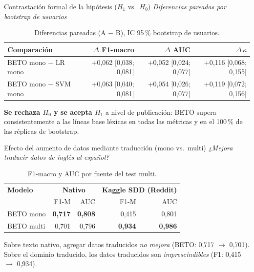 ﻿\documentclass[11pt,aspectratio=169]{beamer}
\newcommand{\ugrsubtitle}[1]{%
  \vskip-0.25cm
  \small\textcolor{ugrGris}{\emph{#1}}\par
  \vskip0.15cm
}
\newcommand{\ugrblock}[2]{
  \begin{tcolorbox}[
    enhanced, colback=ugrFondoClaro, colframe=ugrAzul, boxrule=0.8pt, arc=3pt,
    title={\textbf{#1}}, fonttitle=\small\bfseries, coltitle=white, colbacktitle=ugrAzul,
    left=6pt, right=6pt, top=2pt, bottom=2pt, before skip=0.3em, after skip=0.2em
  ]
    #2
  \end{tcolorbox}
}
\newcommand{\ugrblockok}[2]{
  \begin{tcolorbox}[
    enhanced, colback=ugrVerde!8, colframe=ugrVerde, boxrule=0.8pt, arc=3pt,
    title={\textbf{#1}}, fonttitle=\small\bfseries, coltitle=white, colbacktitle=ugrVerde,
    left=6pt, right=6pt, top=2pt, bottom=2pt, before skip=0.3em, after skip=0.2em
  ]
    #2
  \end{tcolorbox}
}
\begin{document}
\begin{frame}{Contrastación formal de la hipótesis ($H_1$ vs.\ $H_0$)}
  \ugrsubtitle{Diferencias pareadas por bootstrap de usuarios}
  \begin{table}
    \centering\footnotesize
    \setlength{\tabcolsep}{4pt}
    \caption{Diferencias pareadas (A $-$ B), IC 95\,\% bootstrap de usuarios.}
    \begin{tabular}{lrrr}
      \toprule
      \textbf{Comparación} & $\Delta$ F1-macro & $\Delta$ AUC & $\Delta\,\kappa$ \\
      \midrule
      BETO mono $-$ LR mono & +0{,}062 {[0{,}038; 0{,}081]} & +0{,}052 {[0{,}024; 0{,}077]} & +0{,}116 {[0{,}068; 0{,}155]} \\
      BETO mono $-$ SVM mono & +0{,}063 {[0{,}040; 0{,}081]} & +0{,}054 {[0{,}026; 0{,}077]} & +0{,}119 {[0{,}072; 0{,}156]} \\
      \bottomrule
    \end{tabular}
  \end{table}
  \ugrblockok{Decisión formal}{
    \textbf{Se rechaza $H_0$ y se acepta $H_1$} a nivel de publicación: BETO supera consistentemente a las líneas base léxicas en todas las métricas y en el 100\,\% de las réplicas de bootstrap.
  }
\end{frame}

\begin{frame}{Efecto del aumento de datos mediante traducción (mono vs.\ multi)}
  \ugrsubtitle{¿Mejora traducir datos de inglés al español?}
  \begin{table}
    \centering\footnotesize
    \setlength{\tabcolsep}{3pt}
    \caption{F1-macro y AUC por fuente del test multi.}
    \begin{tabular}{lrrrr}
      \toprule
      \textbf{Modelo} & \multicolumn{2}{c}{\textbf{Nativo}} & \multicolumn{2}{c}{\textbf{Kaggle SDD (Reddit)}} \\
      & F1-M & AUC & F1-M & AUC \\
      \midrule
      BETO mono & \textbf{0{,}717} & \textbf{0{,}808} & 0{,}415 & 0{,}801 \\
      BETO multi & 0{,}701 & 0{,}796 & \textbf{0{,}934} & \textbf{0{,}986} \\
      \bottomrule
    \end{tabular}
  \end{table}
  \ugrblock{Hallazgo principal}{
    Sobre texto nativo, agregar datos traducidos \emph{no mejora} (BETO: 0{,}717 $\rightarrow$ 0{,}701). Sobre el dominio traducido, los datos traducidos son \emph{imprescindibles} (F1: 0{,}415 $\rightarrow$ 0{,}934).
  }
\end{frame}
\end{document}
